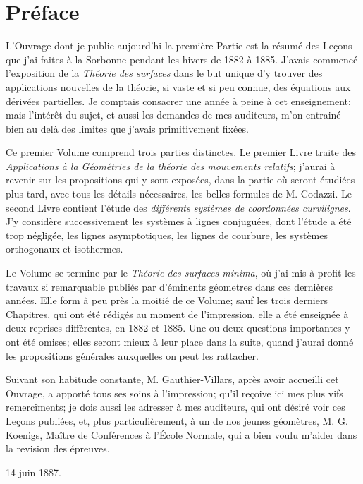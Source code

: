 \newcommand{\tmtextit}[1]{{\itshape{#1}}}

\chapter*{Préface}

L'Ouvrage dont je publie aujourd'hi la première Partie est la résumé des Leçons que j'ai faites à la Sorbonne pendant 
les hivers de 1882 à 1885. J'avais commencé l'exposition de la \textit{Théorie des surfaces} dans le but unique d'y 
trouver des applications nouvelles de la théorie, si vaste et si peu connue, des équations aux dérivées partielles. Je 
comptais consacrer une année à peine à cet enseignement; mais l'intérêt du sujet, et aussi les demandes de mes 
auditeurs, m'on entrainé bien au delà des limites que j'avais primitivement fixées.

Ce premier Volume comprend trois parties distinctes. Le premier Livre traite des \textit{Applications à la Géométries 
de la théorie des mouvements relatifs}; j'aurai à revenir sur les propositions qui y sont exposées, dans la partie où 
seront étudiées plus tard, avec tous les détails nécessaires, les belles formules de M. Codazzi. Le second Livre 
contient l'étude des \textit{différents systèmes de coordonnées curvilignes}. J'y considère successivement les systèmes 
à lignes conjuguées, dont l'étude a été trop négligée, les lignes asymptotiques, les lignes de courbure, les systèmes 
orthogonaux et isothermes.

Le Volume se termine par le \textit{Théorie des surfaces minima}, où j'ai mis à profit les travaux si remarquable 
publiés par d'éminents géometres dans ces dernières années. Elle form à peu près la moitié de ce Volume; sauf les trois 
derniers Chapitres, qui ont été rédigés au moment de l'impression, elle a été enseignée à deux reprises diffèrentes, en 
1882 et 1885. Une ou deux questions importantes y ont été omises; elles seront mieux à leur place dans la suite, quand 
j'aurai donné les propositions générales auxquelles on peut les rattacher.

Suivant son habitude constante, M. Gauthier-Villars, après avoir accueilli cet Ouvrage, a apporté tous ses soins à 
l'impression; qu'il reçoive ici mes plus vifs remercîments; je dois aussi les adresser à mes auditeurs, qui ont désiré 
voir ces Leçons publiées, et, plus particulièrement, à un de nos jeunes géomètres, M. G. Koenigs, Maître de Conférences 
à l'École Normale, qui a bien voulu m'aider dans la revision des épreuves.

\begin{flushright}
  {\small{14 juin 1887.}}
\end{flushright}
